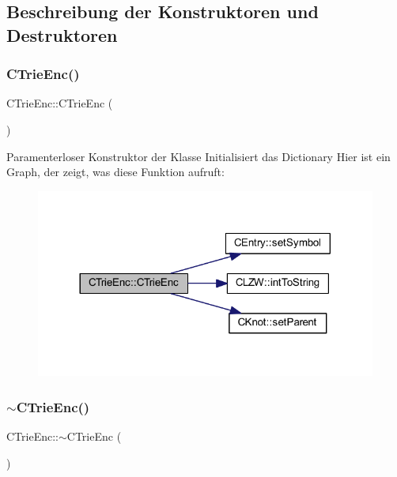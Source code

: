 \subsection{Beschreibung der Konstruktoren und Destruktoren}
\mbox{\label{class_c_trie_enc_ace11a48f0a8dab419a410b61cb58cfdc}} 
\subsubsection{\texorpdfstring{C\+Trie\+Enc()}{CTrieEnc()}}
{\footnotesize\ttfamily C\+Trie\+Enc\+::\+C\+Trie\+Enc (\begin{DoxyParamCaption}{ }\end{DoxyParamCaption})}

Paramenterloser Konstruktor der Klasse Initialisiert das Dictionary Hier ist ein Graph, der zeigt, was diese Funktion aufruft\+:
\nopagebreak
\begin{figure}[H]
\begin{center}
\leavevmode
\includegraphics[width=317pt]{class_c_trie_enc_ace11a48f0a8dab419a410b61cb58cfdc_cgraph}
\end{center}
\end{figure}
\mbox{\label{class_c_trie_enc_a6627940420ef4052bd8d395db959b562}} 
\subsubsection{\texorpdfstring{$\sim$\+C\+Trie\+Enc()}{~CTrieEnc()}}
{\footnotesize\ttfamily C\+Trie\+Enc\+::$\sim$\+C\+Trie\+Enc (\begin{DoxyParamCaption}{ }\end{DoxyParamCaption})}



